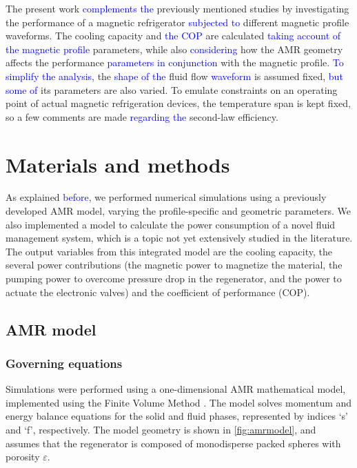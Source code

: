 \documentclass[referee]{svjour3}
\begin{document}

The present work \textcolor{blue}{complements the} previously mentioned studies by investigating the performance of a magnetic refrigerator \textcolor{blue}{subjected to} different magnetic profile waveforms. The cooling capacity and \textcolor{blue}{the COP} are calculated \textcolor{blue}{taking account of the magnetic profile} parameters, while also \textcolor{blue}{considering} how the AMR geometry affects the performance \textcolor{blue}{parameters in conjunction} with the magnetic profile. \textcolor{blue}{To simplify the analysis,} the \textcolor{blue}{shape of the} fluid flow \textcolor{blue}{waveform} is assumed fixed, \textcolor{blue}{but some of} its parameters are also varied. To emulate constraints on an operating point of actual magnetic refrigeration devices, the temperature span is kept fixed, so a few comments are made \textcolor{blue}{regarding the} second-law efficiency.

\section{Materials and methods}
\label{sec:materials-methods}

As explained \textcolor{blue}{before}, we performed numerical simulations using a previously developed AMR model, varying the profile-specific and geometric parameters. We also implemented a model to calculate the power consumption of a novel fluid management system, which is a topic not yet extensively studied in the literature. The output variables from this integrated model are the cooling capacity, the several power contributions (the magnetic power to magnetize the material, the pumping power to overcome pressure drop in the regenerator, and the power to actuate the electronic valves) and the coefficient of performance (COP).


\subsection{AMR model}
\label{sec:amr-model}

\subsubsection{Governing equations}
\label{sec:governing-equations}

Simulations were performed using a one-dimensional AMR mathematical model, implemented using the Finite Volume Method \cite{bib:trevizoli16_perfor_model}. The model solves momentum and energy balance equations for the solid and fluid phases, represented by indices `s' and `f', respectively. The model geometry is shown in \autoref{fig:amrmodel}, and assumes that the regenerator is composed of monodisperse packed spheres with porosity $\varepsilon$.
\end{document}
